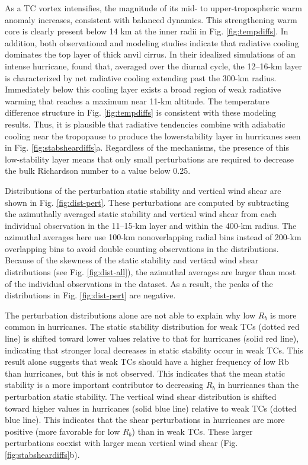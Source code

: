 As a TC vortex intensifies, the magnitude of its mid- to upper-tropospheric warm anomaly increases, consistent with balanced dynamics.
This strengthening warm core is clearly present below 14 km at the inner radii in Fig. \ref{fig:tempdiffs}.
In addition, both observational \citep{Garrettetal2005} and modeling \citep{Buetal2014} studies indicate that radiative cooling dominates the top layer of thick anvil cirrus.
In their idealized simulations of an intense hurricane, \cite{Buetal2014} found that, averaged over the diurnal cycle, the 12--16-km layer is characterized by net radiative cooling extending past the 300-km radius.
Immediately below this cooling layer exists a broad region of weak radiative warming that reaches a maximum near 11-km altitude.
The temperature difference structure in Fig. \ref{fig:tempdiffs} is consistent with these modeling results.
Thus, it is plausible that radiative tendencies combine with adiabatic cooling near the tropopause to produce the lowerstability layer in hurricanes seen in Fig. \ref{fig:stabsheardiffs}a.
Regardless of the mechanisms, the presence of this low-stability layer means that only small perturbations are required to decrease the bulk Richardson number to a value below 0.25.

Distributions of the perturbation static stability and vertical wind shear are shown in Fig. \ref{fig:dist-pert}.
These perturbations are computed by subtracting the azimuthally averaged static stability and vertical wind shear from each individual observation in the 11–15-km layer and within the 400-km radius.
The azimuthal averages here use 100-km nonoverlapping radial bins instead of 200-km overlapping bins to avoid double counting observations in the distributions.
Because of the skewness of the static stability and vertical wind shear distributions (see Fig. \ref{fig:dist-all}), the azimuthal averages are larger than most of the individual observations in the dataset.
As a result, the peaks of the distributions in Fig. \ref{fig:dist-pert} are negative.

The perturbation distributions alone are not able to explain why low $R_b$ is more common in hurricanes.
The static stability distribution for weak TCs (dotted red line) is shifted toward lower values relative to that for hurricanes (solid red line), indicating that stronger local decreases in static stability occur in weak TCs.
This result alone suggests that weak TCs should have a higher frequency of low Rb than hurricanes, but this is not observed.
This indicates that the mean static stability is a more important contributor to decreasing $R_b$ in hurricanes than the perturbation static stability.
The vertical wind shear distribution is shifted toward higher values in hurricanes (solid blue line) relative to weak TCs (dotted blue line).
This indicates that the shear perturbations in hurricanes are more positive (more favorable for low $R_b$) than in weak TCs.
These larger perturbations coexist with larger mean vertical wind shear (Fig. \ref{fig:stabsheardiffs}b).

